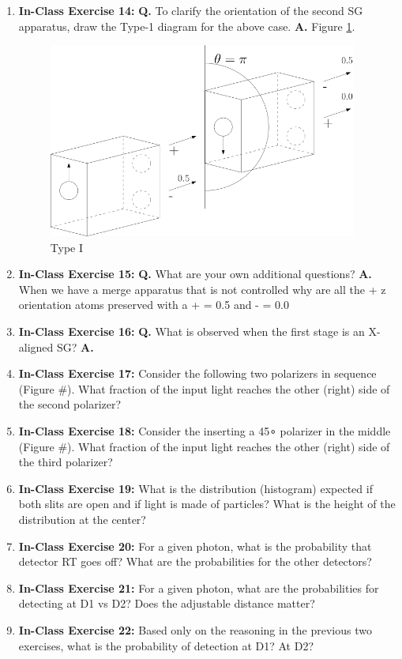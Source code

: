 \documentclass[main.tex]{subfiles}
\begin{document}
\begin{enumerate}
\item[] \textbf{In-Class Exercise 14:} \textbf{Q.} To clarify the orientation of the second SG apparatus, draw the Type-1 diagram for the above case. \textbf{A.} Figure \ref{fig:e14_Type_I}.

    \begin{figure}
        \centering
        \includegraphics[width=4in]{modules/figs/m01/e14_Type_I.png}
        \caption{Type I}
        \label{fig:e14_Type_I}
    \end{figure}

\item[] \textbf{In-Class Exercise 15:} \textbf{Q.} What are your own additional questions? \textbf{A.} When we have a merge apparatus that is not controlled why are all the + z orientation atoms preserved with a + = 0.5 and - = 0.0

\item[] \textbf{In-Class Exercise 16:} \textbf{Q.} What is observed when the first stage is an X-aligned SG? \textbf{A.} 

\item[] \textbf{In-Class Exercise 17:} Consider the following two polarizers in sequence (Figure #). What fraction of the input light reaches the other (right) side of the second polarizer?

\item[] \textbf{In-Class Exercise 18:} Consider the inserting a 45∘ polarizer in the middle (Figure #). What fraction of the input light reaches the other (right) side of the third polarizer?

\item[] \textbf{In-Class Exercise 19:} What is the distribution (histogram) expected if both slits are open and if light is made of particles? What is the height of the distribution at the center?

\item[] \textbf{In-Class Exercise 20:} For a given photon, what is the probability that detector RT goes off? What are the probabilities for the other detectors?

\item[] \textbf{In-Class Exercise 21:} For a given photon, what are the probabilities for detecting at D1 vs D2? Does the adjustable distance matter?

\item[] \textbf{In-Class Exercise 22:} Based only on the reasoning in the previous two exercises, what is the probability of detection at D1? At D2?

\end{enumerate}
\end{document}
